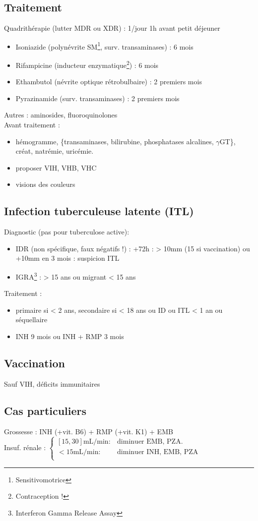 \documentclass{article}
\begin{document}
\subsection{Traitement}
Quadrithérapie (lutter MDR ou XDR) : 1/jour 1h avant petit déjeuner
\begin{itemize}
\item Isoniazide (polynévrite SM\footnote{Sensitivomotrice}, surv. transaminases) : 6 mois
\item Rifampicine (inducteur enzymatique\footnote{Contraception !}) : 6 mois
\item Ethambutol (névrite optique rétrobulbaire) : 2 premiers mois
\item Pyrazinamide (surv. transaminases) : 2 premiers mois
\end{itemize}
Autres : aminosides, fluoroquinolones \\
Avant traitement : 
\begin{itemize}
\item hémogramme, \{transaminases, bilirubine, phosphatases alcalines,
  $\gamma$GT\}, créat, natrémie, uricémie.
\item proposer VIH, VHB, VHC
\item visions des couleurs
\end{itemize}

\subsection{Infection tuberculeuse latente (ITL)}
Diagnostic (\danger pas pour tuberculose active): 
\begin{itemize}
\item IDR (non spécifique, faux négatifs !) : +72h : \diameter > 10mm (15 si vaccination) ou +10mm en 3 mois : suspicion ITL
\item IGRA\footnote{Interferon Gamma Release Assay} : > 15 ans ou migrant  < 15 ans
\end{itemize}
Traitement : 
\begin{itemize}
\item primaire si < 2 ans, secondaire si < 18 ans ou ID ou ITL < 1 an ou séquellaire
\item INH 9 mois ou INH + RMP 3 mois
\end{itemize}
\subsection{Vaccination}
Sauf VIH, déficits immunitaires
\subsection{Cas particuliers}
Grossesse : INH (+vit. B6) + RMP (+vit. K1) + EMB\\
Insuf. rénale :
$ \begin{cases}
    [15,30] \text{mL/min} : & \text{diminuer EMB, PZA}.\\
    < 15 \text{mL/min} : & \text{diminuer INH, EMB, PZA}\\
  \end{cases} $
  
\end{document}
